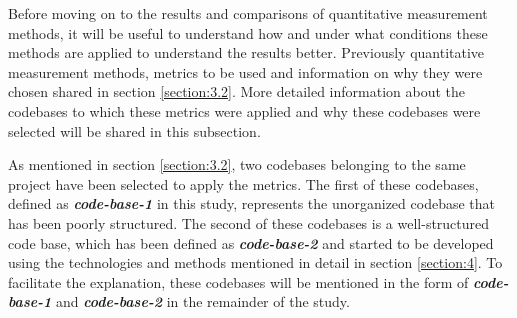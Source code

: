 Before moving on to the results and comparisons of quantitative measurement methods, it will be useful to understand how and under what conditions these methods are applied to understand the results better. Previously quantitative measurement methods, metrics to be used and information on why they were chosen shared in section \ref{section:3.2}. More detailed information about the codebases to which these metrics were applied and why these codebases were selected will be shared in this subsection.

As mentioned in section \ref{section:3.2}, two codebases belonging to the same project have been selected to apply the metrics. The first of these codebases, defined as \textbf{\textit{code-base-1}} in this study, represents the unorganized codebase that has been poorly structured. The second of these codebases is a well-structured code base, which has been defined as \textbf{\textit{code-base-2}} and started to be developed using the technologies and methods mentioned in detail in section \ref{section:4}. To facilitate the explanation, these codebases will be mentioned in the form of \textbf{\textit{code-base-1}} and \textbf{\textit{code-base-2}} in the remainder of the study.


